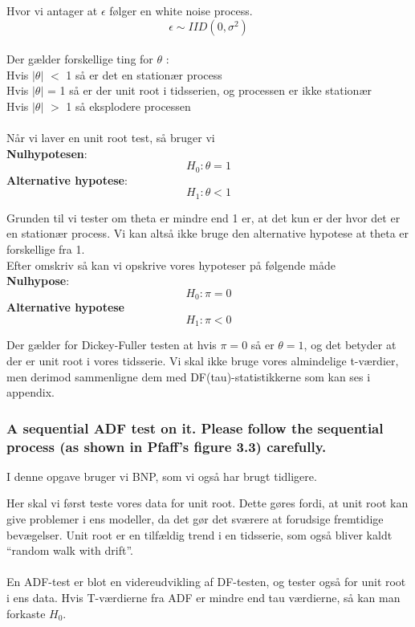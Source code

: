 \documentclass[
  10pt,
]{article}
\begin{document}
Hvor vi antager at \(\epsilon\) følger en white noise process.\\
\[\epsilon \sim IID(0,\sigma^2)\]\\
Der gælder forskellige ting for \(\theta\) :\\
Hvis \(|\theta|\) \(<\) 1 så er det en stationær process\\
Hvis \(|\theta|\) = 1 så er der unit root i tidsserien, og processen er
ikke stationær\\
Hvis \(|\theta|\) \(>\) 1 så eksplodere processen\\
~\\
Når vi laver en unit root test, så bruger vi\\
\textbf{Nulhypotesen}: \[H_0: \theta = 1 \tag{Unit root} \]
\textbf{Alternative hypotese}: \[H_1: \theta < 1 \tag{No unit root}\]

Grunden til vi tester om theta er mindre end 1 er, at det kun er der
hvor det er en stationær process. Vi kan altså ikke bruge den
alternative hypotese at theta er forskellige fra 1.\\
Efter omskriv så kan vi opskrive vores hypoteser på følgende måde\\
\textbf{Nulhypose}: \[H_0: \pi = 0 \tag{Unit root}\]
\textbf{Alternative hypotese} \[H_1: \pi < 0 \tag{No unit root}\]

Der gælder for Dickey-Fuller testen at hvis \(\pi = 0\) så er
\(\theta = 1\), og det betyder at der er unit root i vores tidsserie. Vi
skal ikke bruge vores almindelige t-værdier, men derimod sammenligne dem
med DF(tau)-statistikkerne som kan ses i appendix.

\hypertarget{a-sequential-adf-test-on-it.-please-follow-the-sequential-process-as-shown-in-pfaffs-figure-3.3-carefully.}{%
\subsubsection{A sequential ADF test on it. Please follow the sequential
process (as shown in Pfaff's figure 3.3)
carefully.}\label{a-sequential-adf-test-on-it.-please-follow-the-sequential-process-as-shown-in-pfaffs-figure-3.3-carefully.}}

I denne opgave bruger vi BNP, som vi også har brugt tidligere.

Her skal vi først teste vores data for unit root. Dette gøres fordi, at
unit root kan give problemer i ens modeller, da det gør det sværere at
forudsige fremtidige bevægelser. Unit root er en tilfældig trend i en
tidsserie, som også bliver kaldt ``random walk with drift''.\\
~\\
En ADF-test er blot en videreudvikling af DF-testen, og tester også for
unit root i ens data. Hvis T-værdierne fra ADF er mindre end tau
værdierne, så kan man forkaste \(H_0\).\\
~\\
\end{document}
